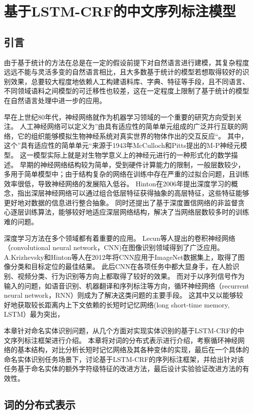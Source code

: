 \chapter{基于LSTM-CRF的中文序列标注模型}
\section{引言}
由于基于统计的方法在总是在一定的假设前提下对自然语言进行建模，其复杂程度远远不能与灵活多变的自然语言相比，且大多数基于统计的模型若想取得较好的识别效果，总要较大程度地依赖人工构建语料库、字典、特征等手段，且不同语言、不同领域语料之间模型的可迁移性也较差，这在一定程度上限制了基于统计的模型在自然语言处理中进一步的应用。

早在上世纪80年代，神经网络就作为机器学习领域的一个重要的研究方向受到关注。
人工神经网络可以定义为”由具有适应性的简单单元组成的广泛并行互联的网络，它的组织能够模拟生物神经系统对真实世界的物体作出的交互反应“。
其中，这个”具有适应性的简单单元“来源于1943年McCulloch和Pitts提出的M-P神经元模型。
这一模型实际上就是对生物学意义上的神经元进行的一种形式化的数学描述。
早期的神经网络结构较为简单，受到硬件计算能力的限制，一般层数较少，多用于简单模型中；由于结构复杂的网络在训练中存在严重的过拟合问题，且训练效率很低，导致神经网络的发展陷入低谷。
Hinton在2006年提出深度学习的概念，指出深层神经网络可以通过组合低层特征获得抽象的高层特征，这些特征能够更好地对数据的信息进行整合抽象。
同时还提出了基于深度置信网络的非监督贪心逐层训练算法，能够较好地适应深层网络结构，解决了当网络层数较多时的训练难的问题。

深度学习方法在多个领域都有着重要的应用。
Lecun等人提出的卷积神经网络（convolutional neural network，CNN)在图像识别领域得到了广泛应用。
A.Krizhevsky和Hinton等人在2012年将CNN应用于ImageNet数据集上，取得了图像分类和目标定位的最佳结果。
此后CNN在各项任务中都大显身手，在人脸识别、视频分类、行为识别等方向上都取得了较好的效果。
而对于以序列信号作为输入的问题，如语音识别、机器翻译和序列标注等方向，循环神经网络（recurrent neural network，RNN）则成为了解决这类问题的主要手段。
这其中又以能够较好地获取较长距离内上下文依赖的长短时记忆网络(long short-time memory, LSTM）最为突出，

本章针对命名实体识别问题，从几个方面对实现实体识别的基于LSTM-CRF的中文序列标注框架进行介绍。
本章将对词的分布式表示进行介绍，考察循环神经网络的基本结构，对比分析长短时记忆网络及其各种变体的实现，最后在一个具体的命名实体识别任务场景下，讨论基于LSTM-CRF的序列标注框架，并给出针对该任务基于命名实体的额外字符级特征的改进方法，最后设计实验验证改进方法的有效性。

\section{词的分布式表示}
